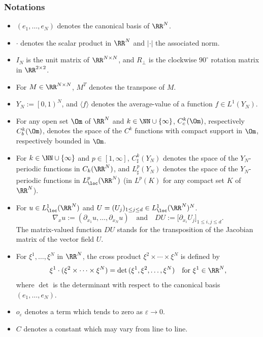 \skpt
\subsubsection*{Notations}
\begin{itemize}
\item $\left(e_1,\dots,e_N\right)$ denotes the canonical basis of $\RR^N$.
\item $\cdot$ denotes the scalar product in $\RR^N$ and $|\cdot|$ the associated norm.
\item $I_N$ is the unit matrix of $\RR^{N\times N}$, and $R_\perp$ is the clockwise $90^\circ$ rotation matrix in $\RR^{2\times 2}$.
\item For $M\in\RR^{N\times N}$, $M^T$ denotes the transpose of $M$.
\item $Y_N:=\left[0,1\right)^N$, and $\langle f\rangle$ denotes the average-value of a function $f\in L^1(Y_N)$.

\item For any open set $\Om$ of $\RR^N$ and $k\in\NN\cup\{\infty\}$, $C^k_c(\Om)$, respectively $C^k_b(\Om)$, denotes the space of the $C^k$ functions with compact support in $\Om$, respectively bounded in $\Om$.
\item For $k\in\NN\cup\{\infty\}$ and $p\in[1,\infty]$, $C^k_\sharp(Y_N)$ denotes the space of the $Y_N$-periodic functions in $C_k(\RR^N)$, and $L^p_\sharp(Y_N)$ denotes the space of the $Y_N$-periodic functions in $L^p_\loc(\RR^N)$ (\ie in $L^p(K)$ for any compact set $K$ of $\RR^N$).
\item For $u\in L^1_\loc(\RR^N)$ and $U=(U_j)_{1\leq j\leq d}\in L^1_\loc(\RR^N)^N$.
\[
\nabla_x u:=\left(\partial_{x_1}u,\dots,\partial_{x_N}u\right)\quad\mbox{and}\quad DU:=\big[\partial_{x_i}U_j\big]_{1\leq i,j\leq d}.
\]
The matrix-valued function $DU$ stands for the transposition of the Jacobian matrix of the vector field $U$.
\item For $\xi^1,\dots,\xi^N$ in $\RR^N$, the cross product $\xi^2\times\cdots\times \xi^N$ is defined by
\begin{equation}\label{crpr}
\xi^1\cdot(\xi^2\times\dots\times \xi^N)=\det\,(\xi^1,\xi^2,\dots,\xi^N)\quad\mbox{for }\xi^1\in\RR^N,
\end{equation}
where $\det$ is the determinant with respect to the canonical basis $(e_1,\dots,e_N)$.
\item $o_\varepsilon$ denotes a term which tends to zero as $\varepsilon\to 0$.
\item $C$ denotes a constant which may vary from line to line.
\end{itemize}

